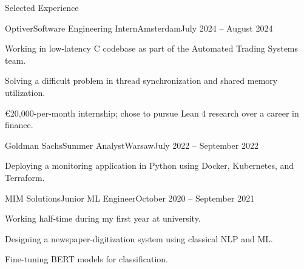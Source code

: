 \documentclass{article}
\newlength{\tabin}
\newlength{\secsep}
\newcommand{\lineunder}{\vspace*{-8pt} \\ \hspace*{-6pt} \hrulefill \\ \vspace*{-15pt}}
\newcommand{\cvlink}[2]{\href{#1}{\nolinkurl{#2}}}
\newenvironment{tabbedsection}[1]{
  \begin{list}{}{
      \setlength{\itemsep}{0pt}
      \setlength{\labelsep}{0pt}
      \setlength{\labelwidth}{0pt}
      \setlength{\leftmargin}{\tabin}
      \setlength{\rightmargin}{\tabin}
      \setlength{\listparindent}{0pt}
      \setlength{\parsep}{0pt}
      \setlength{\parskip}{0pt}
      \setlength{\partopsep}{0pt}
      \setlength{\topsep}{#1}
    }
  \item[]
}{\end{list}}
\newenvironment{resume_section}[1]{
  \filbreak
  \vspace{2\secsep}
  \textsc{\large#1}
  \lineunder
  \begin{tabbedsection}{\secsep}
}{\end{tabbedsection}}
\newenvironment{resume_subsection}[2][]{
  \textbf{#2} \hfill {\footnotesize #1}%
  \begin{tabbedsection}{0.5\secsep}
}{\end{tabbedsection}}
\newenvironment{subitems}{
  \renewcommand{\labelitemi}{-}
  \begin{itemize}
      \setlength{\labelsep}{1em}
}{\end{itemize}}
\newenvironment{resume_employer}[4]{
  \vspace{\secsep}
  \textbf{#1} \\ 
  \def\resumelocation{#3}%
  \indent {\small #2\ifx\resumelocation\empty\else, #3\fi} \hfill {\footnotesize #4}%
  \begin{tabbedsection}{0pt}
  \begin{subitems}
}{\end{subitems}\end{tabbedsection}}
\begin{document}
\begin{resume_section}{Selected Experience}
  \begin{resume_employer}{Optiver}{Software Engineering Intern}{Amsterdam}{July 2024 -- August 2024}
   \item Working in low-latency C codebase as part of the Automated Trading Systems team.
   \item Solving a difficult problem in thread synchronization and shared memory utilization.
   \item €20,000-per-month internship; chose to pursue Lean 4 research over a career in finance.
  \end{resume_employer}
  \begin{resume_employer}{Goldman Sachs}{Summer Analyst}{Warsaw}{July 2022 -- September 2022}
  \item Deploying a monitoring application in Python using Docker, Kubernetes, and Terraform.
  \end{resume_employer}
  \begin{resume_employer}{MIM Solutions}{Junior ML Engineer}{}{October 2020 -- September 2021}
  \item Working half-time during my first year at university.
  \item Designing a newspaper-digitization system using classical NLP and ML.
  \item Fine-tuning BERT models for classification.
  \end{resume_employer}

\end{resume_section}
\end{document}
